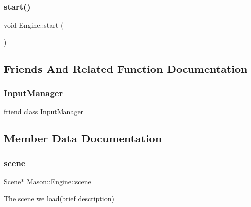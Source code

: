 \hypertarget{class_mason_1_1_engine_a4d8066dd213a03f5420d1bf60f150ca7}{}\label{class_mason_1_1_engine_a4d8066dd213a03f5420d1bf60f150ca7} 
\subsubsection{\texorpdfstring{start()}{start()}}
{\footnotesize\ttfamily void Engine\+::start (\begin{DoxyParamCaption}{ }\end{DoxyParamCaption})}



\subsection{Friends And Related Function Documentation}
\hypertarget{class_mason_1_1_engine_af0e8c3dcc20b7ddcaf63506363a22821}{}\label{class_mason_1_1_engine_af0e8c3dcc20b7ddcaf63506363a22821} 
\subsubsection{\texorpdfstring{Input\+Manager}{InputManager}}
{\footnotesize\ttfamily friend class \hyperlink{class_mason_1_1_input_manager}{Input\+Manager}\hspace{0.3cm}{\ttfamily [friend]}}



\subsection{Member Data Documentation}
\hypertarget{class_mason_1_1_engine_a2ec6bc225a9327484dde73bb8298ea85}{}\label{class_mason_1_1_engine_a2ec6bc225a9327484dde73bb8298ea85} 
\subsubsection{\texorpdfstring{scene}{scene}}
{\footnotesize\ttfamily \hyperlink{class_mason_1_1_scene}{Scene}$\ast$ Mason\+::\+Engine\+::scene}



The scene we load(brief description) 

